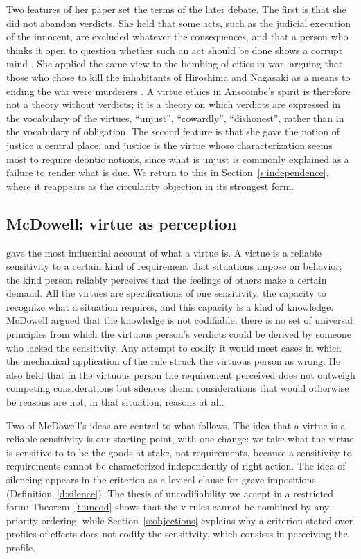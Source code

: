 \documentclass{situationist-preprint}
\begin{document}
Two features of her paper set the terms of the later debate. The first is that she did not abandon verdicts. She held that some acts, such as the judicial execution of the innocent, are excluded whatever the consequences, and that a person who thinks it open to question whether such an act should be done shows a corrupt mind \citep{Anscombe1958}. She applied the same view to the bombing of cities in war, arguing that those who chose to kill the inhabitants of Hiroshima and Nagasaki as a means to ending the war were murderers \citep{Anscombe1981}. A virtue ethics in Anscombe's spirit is therefore not a theory without verdicts; it is a theory on which verdicts are expressed in the vocabulary of the virtues, \enquote{unjust}, \enquote{cowardly}, \enquote{dishonest}, rather than in the vocabulary of obligation. The second feature is that she gave the notion of justice a central place, and justice is the virtue whose characterization seems most to require deontic notions, since what is unjust is commonly explained as a failure to render what is due. We return to this in Section~\ref{s:independence}, where it reappears as the circularity objection in its strongest form.

\subsection{McDowell: virtue as perception}

\citet{McDowell1979} gave the most influential account of what a virtue is. A virtue is a reliable sensitivity to a certain kind of requirement that situations impose on behavior; the kind person reliably perceives that the feelings of others make a certain demand. All the virtues are specifications of one sensitivity, the capacity to recognize what a situation requires, and this capacity is a kind of knowledge. McDowell argued that the knowledge is not codifiable: there is no set of universal principles from which the virtuous person's verdicts could be derived by someone who lacked the sensitivity. Any attempt to codify it would meet cases in which the mechanical application of the rule struck the virtuous person as wrong. He also held that in the virtuous person the requirement perceived does not outweigh competing considerations but silences them: considerations that would otherwise be reasons are not, in that situation, reasons at all.

Two of McDowell's ideas are central to what follows. The idea that a virtue is a reliable sensitivity is our starting point, with one change: we take what the virtue is sensitive to to be the goods at stake, not requirements, because a sensitivity to requirements cannot be characterized independently of right action. The idea of silencing appears in the criterion as a lexical clause for grave impositions (Definition~\ref{d:silence}). The thesis of uncodifiability we accept in a restricted form: Theorem~\ref{t:uncod} shows that the v-rules cannot be combined by any priority ordering, while Section~\ref{s:objections} explains why a criterion stated over profiles of effects does not codify the sensitivity, which consists in perceiving the profile.
\end{document}
